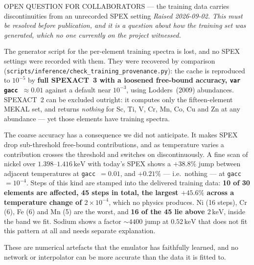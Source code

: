 \documentclass[11pt,a4paper]{article}
\newcommand{\kev}{\,\mathrm{keV}}
\newcommand{\code}[1]{\texttt{#1}}
\begin{document}
\begin{collabquestion}{OPEN QUESTION FOR COLLABORATORS --- the training data
carries discontinuities from an unrecorded SPEX setting}
\label{box:gacc}
\emph{Raised 2026-09-02. This must be resolved before publication, and it is a
question about how the training set was generated, which no one currently on
the project witnessed.}

The generator script for the per-element training spectra is lost, and no SPEX
settings were recorded with them. They were recovered by comparison
(\code{scripts/inference/check\_training\_provenance.py}): the cache is
reproduced to $10^{-5}$ by \textbf{full SPEXACT~3 with a loosened free-bound
accuracy, \code{var gacc}~$\approx0.01$} against a default near $10^{-3}$, using
Lodders~(2009) abundances. SPEXACT~2 can be excluded outright: it computes only
the fifteen-element MEKAL set, and returns \emph{nothing} for Sc, Ti, V, Cr, Mn,
Co, Cu and Zn at any abundance --- yet those elements have training spectra.

The coarse accuracy has a consequence we did not anticipate. It makes SPEX drop
sub-threshold free-bound contributions, and as temperature varies a
contribution crosses the threshold and switches on discontinuously. A fine scan
of nickel over $1.398$--$1.416\kev$ with today's SPEX shows a
$\mathbf{+38.8\%}$ jump between adjacent temperatures at \code{gacc}~$=0.01$,
and $\mathbf{+0.21\%}$ --- i.e.\ nothing --- at \code{gacc}~$=10^{-4}$. Steps of
this kind are stamped into the delivered training data:
\textbf{10 of 30 elements are affected, 45 steps in total, the largest
$+45.6\%$ across a temperature change of $2\times10^{-4}$}, which no physics
produces. Ni (16 steps), Cr (6), Fe (6) and Mn (5) are the worst, and
\textbf{16 of the 45 lie above $2\kev$}, inside the band we fit. Sodium shows a
factor $\sim\!4400$ jump at $0.52\kev$ that does not fit this pattern at all
and needs separate explanation.

These are numerical artefacts that the emulator has faithfully learned, and no
network or interpolator can be more accurate than the data it is fitted to.


\end{collabquestion}
\end{document}
